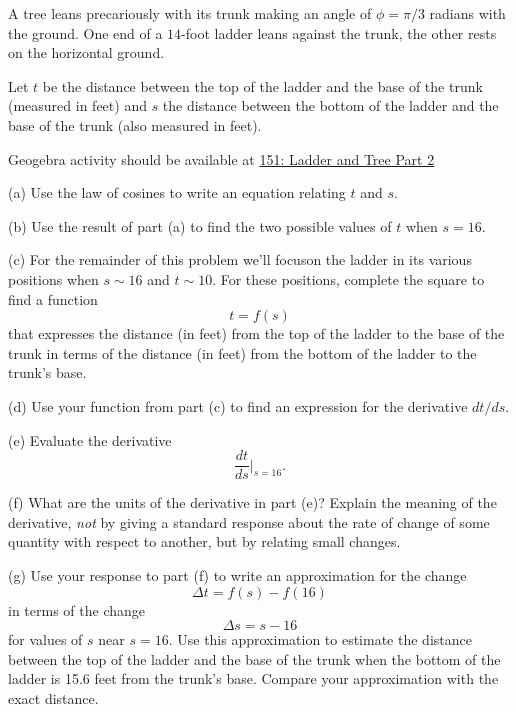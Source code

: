 \documentclass{ximera}
\begin{document}
\begin{question}  \label{Q:df0g43rb4}
A tree leans precariously with its trunk making an angle of $\phi = \pi/3$ radians with the ground. One end of a $14$-foot ladder leans against the trunk, the other rests on the horizontal ground.

Let $t$ be the distance between the top of the ladder and the base of the trunk (measured in feet) and $s$ the distance between the bottom of the ladder and the base of the trunk (also measured in feet).

\begin{onlineOnly}
    \begin{center}
\end{center}
\end{onlineOnly}

Geogebra activity should be available at \href{https://www.geogebra.org/classic/ctf2bcqz}{151: Ladder and Tree Part 2}


(a) Use the law of cosines to write an equation relating $t$ and $s$.

(b) Use the result of part (a) to find the two possible values of $t$ when $s=16$. 

(c) For the remainder of this problem we'll focuson the ladder in its various positions when $s \sim 16$ and $t\sim 10$. For these positions, complete the square to find a function 
\[
    t = f(s)
\]
that expresses the distance (in feet) from the top of the ladder to the base of the trunk in terms of the distance (in feet) from the bottom of the ladder to the trunk's base.

(d) Use your function from part (c) to find an expression for the derivative $dt/ds$.

(e) Evaluate the derivative 
\[
       \frac{dt}{ds}\Big|_{s=16} .
\]

(f) What are the units of the derivative in part (e)? Explain the meaning of the derivative, \emph{not} by giving a standard response about the rate of change of some quantity with respect to another, but by relating small changes.

(g) Use your response to part (f) to write an approximation for the change
\[
         \Delta t = f(s) - f(16)
\]
in terms of the change 
\[
     \Delta s = s - 16
\]
for values of $s$ near $s=16$. Use this approximation to estimate the distance between the top of the ladder and the base of the trunk when the bottom of the ladder is 15.6  feet from the trunk’s base. Compare your approximation with the exact distance.
\end{question}
\end{document}
